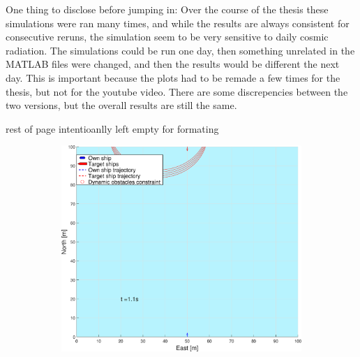 One thing to disclose before jumping in: Over the course of the thesis these simulations were ran many times, and while the results are always consistent
for consecutive reruns, the simulation seem to be very sensitive to daily cosmic radiation. The simulations could be run one day, then something unrelated in the
MATLAB files were changed, and then the results would be different the next day. This is important because the plots had to be remade a few times for the
thesis, but not for the youtube video. There are some discrepencies between the two versions, but the overall results are still the same.

\vfill
rest of page intentioanlly left empty for formating
\vfill 

\clearpage
\begin{figure}[ht!] %
    \begin{subfigure}[b]{0.49\textwidth}
        \centering
        \includegraphics[width=\textwidth]{Images/Figures/enkel_HO/_Simple_0fig1_time=1}

\end{subfigure}
\end{figure}
